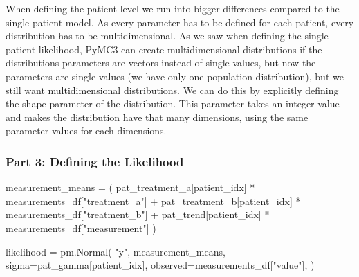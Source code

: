 \documentclass[12pt,a4paper,leqno]{report}
\theoremstyle{plain}
\theoremstyle{definition}
\theoremstyle{remark}
\begin{document}
When defining the patient-level we run into bigger differences compared to the single
patient model. As every parameter has to be defined for each patient, every distribution
has to be multidimensional. As we saw when defining the single patient likelihood, PyMC3
can create multidimensional distributions if the distributions parameters are vectors
instead of single values, but now the parameters are single values (we have only one
population distribution), but we still want multidimensional distributions. We can do
this by explicitly defining the shape parameter of the distribution. This parameter
takes an integer value and makes the distribution have that many
dimensions, using the same parameter values for each dimensions.

\subsubsection*{Part 3: Defining the Likelihood}
\bigskip
\begin{pyverbatim}[][fontsize=\footnotesize]
    measurement_means = (
        pat_treatment_a[patient_idx] * measurements_df["treatment_a"]
        + pat_treatment_b[patient_idx] * measurements_df["treatment_b"]
        + pat_trend[patient_idx] * measurements_df["measurement"]
    )

    likelihood = pm.Normal(
        "y",
        measurement_means,
        sigma=pat_gamma[patient_idx],
        observed=measurements_df["value"],
    )
\end{pyverbatim}
\bigskip

\end{document}
